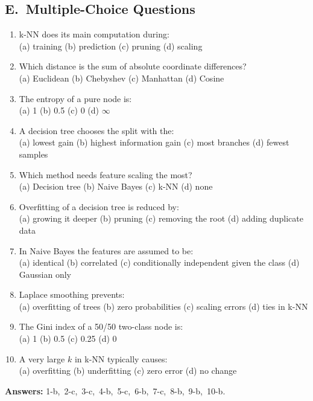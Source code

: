 \subsection*{E.\ Multiple-Choice Questions}
\begin{enumerate}
  \item k-NN does its main computation during: \\
  (a) training \quad (b) prediction \quad (c) pruning \quad (d) scaling
  \item Which distance is the sum of absolute coordinate differences? \\
  (a) Euclidean \quad (b) Chebyshev \quad (c) Manhattan \quad (d) Cosine
  \item The entropy of a pure node is: \\
  (a) 1 \quad (b) 0.5 \quad (c) 0 \quad (d) $\infty$
  \item A decision tree chooses the split with the: \\
  (a) lowest gain \quad (b) highest information gain \quad (c) most branches \quad (d) fewest samples
  \item Which method needs feature scaling the most? \\
  (a) Decision tree \quad (b) Naive Bayes \quad (c) k-NN \quad (d) none
  \item Overfitting of a decision tree is reduced by: \\
  (a) growing it deeper \quad (b) pruning \quad (c) removing the root \quad (d) adding duplicate data
  \item In Naive Bayes the features are assumed to be: \\
  (a) identical \quad (b) correlated \quad (c) conditionally independent given the class \quad (d) Gaussian only
  \item Laplace smoothing prevents: \\
  (a) overfitting of trees \quad (b) zero probabilities \quad (c) scaling errors \quad (d) ties in k-NN
  \item The Gini index of a 50/50 two-class node is: \\
  (a) 1 \quad (b) 0.5 \quad (c) 0.25 \quad (d) 0
  \item A very large $k$ in k-NN typically causes: \\
  (a) overfitting \quad (b) underfitting \quad (c) zero error \quad (d) no change
\end{enumerate}
\textbf{Answers:} 1-b,\ 2-c,\ 3-c,\ 4-b,\ 5-c,\ 6-b,\ 7-c,\ 8-b,\ 9-b,\ 10-b.

